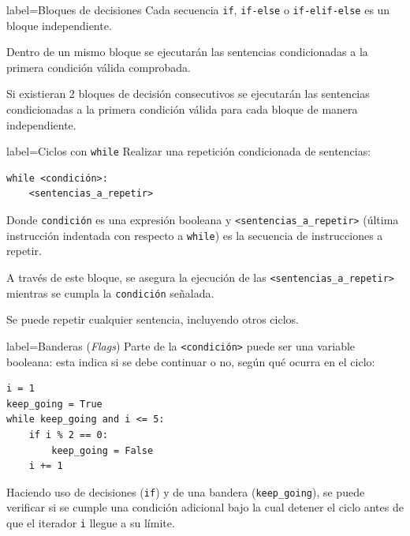 \documentclass[10pt]{article}
\begin{document}
\begin{multicols*}{3}
\begin{contentbox}{label=Bloques de decisiones}
    Cada secuencia \lstinline!if!, \lstinline!if-else! o \lstinline!if-elif-else! es un bloque independiente.
    
    Dentro de un mismo bloque se ejecutarán las sentencias condicionadas a la primera condición válida comprobada.
    
    Si existieran 2 bloques de decisión consecutivos se ejecutarán las sentencias condicionadas a la primera condición válida para cada bloque de manera independiente.
\end{contentbox}

\begin{contentbox}{label=Ciclos con \texttt{while}}
    Realizar una repetición condicionada de sentencias: 
\begin{lstlisting}
while <condición>:
    <sentencias_a_repetir>
\end{lstlisting}

    Donde \lstinline!condición! es una \alert{expresión booleana} y \lstinline!<sentencias_a_repetir>! (última instrucción indentada con respecto a \lstinline!while!) es la secuencia de instrucciones a repetir.
    
    A través de este bloque, se asegura la ejecución de las \lstinline!<sentencias_a_repetir>! mientras se cumpla la \lstinline!condición! señalada.
    
    Se puede repetir cualquier sentencia, incluyendo otros ciclos.
\end{contentbox}

\begin{contentbox}{label=Banderas (\textit{Flags})}
    Parte de la \lstinline!<condición>! puede ser una variable booleana: esta indica si se debe continuar o no, según qué ocurra en el ciclo:
    
\begin{lstlisting}
i = 1
keep_going = True
while keep_going and i <= 5:
    if i % 2 == 0:
        keep_going = False
    i += 1
\end{lstlisting}

    Haciendo uso de decisiones (\lstinline!if!) y de una bandera (\lstinline!keep_going!), se puede verificar si se cumple una condición adicional bajo la cual detener el ciclo antes de que el iterador \lstinline!i! llegue a su límite.
\end{contentbox}


\end{multicols*}
\end{document}
